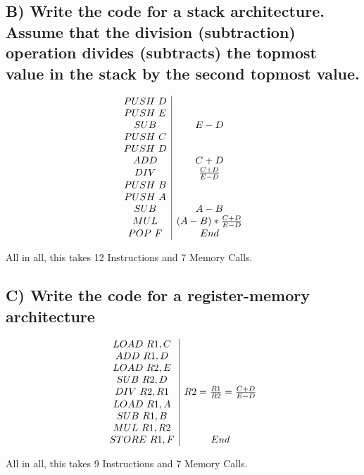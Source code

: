 \documentclass{article}
\begin{document}
\subsection{B) Write the code for a stack architecture. Assume that the division (subtraction) operation divides (subtracts) the topmost value in the stack by the second topmost value.}
\begin{centering}
  \begin{displaymath}
  \begin{array}{c | c}
		PUSH\ D \\
		PUSH\ E \\
		SUB & E-D \\
		PUSH\ C \\
		PUSH\ D \\
		ADD & C+D \\
		DIV & \frac{C+D}{E-D} \\
		PUSH\ B \\
		PUSH\ A \\
		SUB & A-B \\
		MUL & (A-B)*\frac{C+D}{E-D} \\
		POP\ F & End \\
  \end{array}
  \end{displaymath}
\end{centering}
All in all, this takes 12 Instructions and 7 Memory Calls.

\subsection{C) Write the code for a register-memory architecture}
\begin{centering}
  \begin{displaymath}
  \begin{array}{c | c}
		LOAD\ R1,C \\
		ADD\ R1,D \\
		LOAD\ R2,E \\
		SUB\ R2,D \\
		DIV\ R2,R1 & R2= \frac{R1}{R2} = \frac{C+D}{E-D}\\
		LOAD\ R1,A \\
		SUB\ R1,B \\
		MUL\ R1,R2 \\
		STORE\ R1,F & End\\
	\end{array}
  \end{displaymath}
\end{centering}
All in all, this takes 9 Instructions and 7 Memory Calls.
\end{document}
